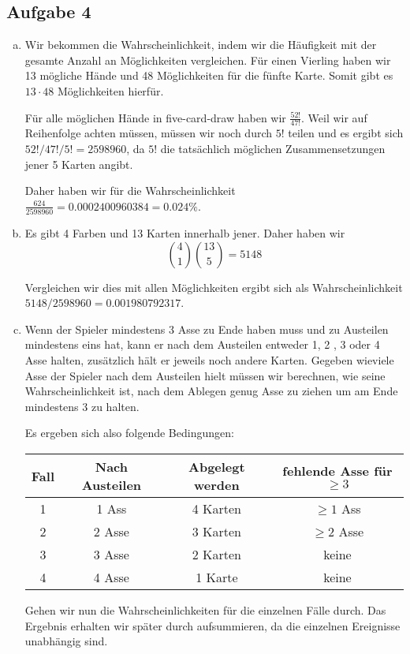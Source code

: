 \subsection*{Aufgabe 4}
\begin{enumerate}[a)]
  \item Wir bekommen die Wahrscheinlichkeit, indem wir die Häufigkeit mit der gesamte Anzahl an Möglichkeiten vergleichen. Für einen Vierling haben wir 13 mögliche Hände und 48 Möglichkeiten für die fünfte Karte. Somit gibt es $13 \cdot 48$ Möglichkeiten hierfür.

  Für alle möglichen Hände in five-card-draw haben wir $\frac{52!}{47!}$. Weil wir auf Reihenfolge achten müssen, müssen wir noch durch $5!$ teilen und es ergibt sich $52! / 47! / 5! = 2 598 960$, da $5!$ die tatsächlich möglichen Zusammensetzungen jener 5 Karten angibt.

  Daher haben wir für die Wahrscheinlichkeit $\frac{624}{2 598 960} = 0.0002400960384 = 0.024 \%$.

  \item Es gibt 4 Farben und 13 Karten innerhalb jener. Daher haben wir \[ \binom{4}{1} \binom{13}{5} = 5148 \]

  Vergleichen wir dies mit allen Möglichkeiten ergibt sich als Wahrscheinlichkeit $5 148 / 2598960=0.001980792317$.

  \item Wenn der Spieler mindestens 3 Asse zu Ende haben muss und zu Austeilen mindestens eins hat, kann er nach dem Austeilen entweder 1, 2 , 3 oder 4 Asse halten, zusätzlich hält er jeweils noch andere Karten. Gegeben wieviele Asse der Spieler nach dem Austeilen hielt müssen wir berechnen, wie seine Wahrscheinlichkeit ist, nach dem Ablegen genug Asse zu ziehen um am Ende mindestens 3 zu halten.

  Es ergeben sich also folgende Bedingungen:

  \begin{tabular}{c c c c}
    Fall & Nach Austeilen & Abgelegt werden & fehlende Asse für $\geq 3$\\
    \hline
    1 & 1 Ass & 4 Karten & $\geq 1$ Ass \\
    2 & 2 Asse & 3 Karten & $\geq 2$ Asse \\
    3 & 3 Asse & 2 Karten & keine \\
    4 & 4 Asse & 1 Karte & keine \\
  \end{tabular}

  Gehen wir nun die Wahrscheinlichkeiten für die einzelnen Fälle durch. Das Ergebnis erhalten wir später durch aufsummieren, da die einzelnen Ereignisse unabhängig sind.


\end{enumerate}
